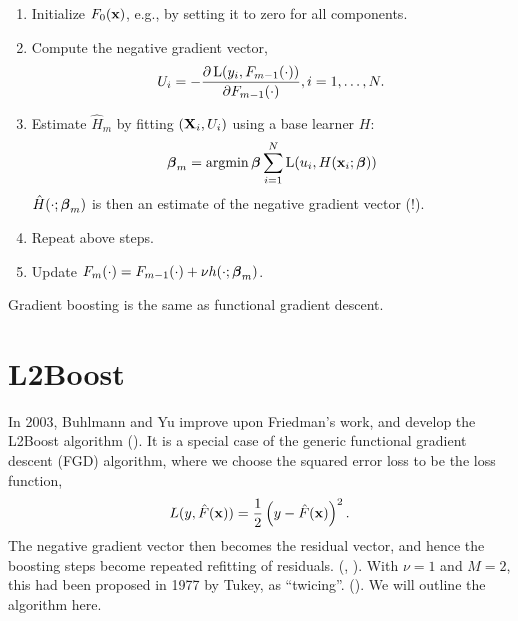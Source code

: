 \begin{enumerate}
    \item Initialize $F_0(\mathbf{x})$, e.g., by setting it to zero for all components.
    \item Compute the negative gradient vector,
        \begin{equation}
            U_i=-\frac{\partial \operatorname{L}(y_i,F_{m-1}(\cdot))}{\partial F_{m-1}(\cdot)}, i=1,\dotsc,N.
        \end{equation}
    \item Estimate $\hat{H}_m$ by fitting $(\mathbf{X}_i,U_i)$ using a base learner $H$:
        \begin{equation}
            \boldsymbol{\beta}_m=\operatorname*{argmin}{\boldsymbol{\beta}}\sum_{i=1}^N\operatorname{L}(u_i,H(\mathbf{x}_i;\boldsymbol{\beta}))
        \end{equation}
        $\hat{H}(\cdot;\boldsymbol{\beta}_m)$ is then an estimate of the negative gradient vector (!).
    \item Repeat above steps.
    \item Update $F_m(\cdot)=F_{m-1}(\cdot)+\nu h(\cdot;\boldsymbol{\beta}_m)$.
\end{enumerate}
Gradient boosting is the same as functional gradient descent.
\section{L2Boost}
In 2003, Buhlmann and Yu improve upon Friedman's work, and develop the L2Boost algorithm (\cite{buhlmann-yu}). It is a special case of the generic functional gradient descent (FGD) algorithm, where we choose the squared error loss to be the loss function,
\begin{equation}
    L(y,\hat{F}(\mathbf{x}))=\frac{1}{2}\left(y-\hat{F}(\mathbf{x})\right)^2.
\end{equation}
The negative gradient vector then becomes the residual vector, and hence the boosting steps become repeated refitting of residuals. (\cite{friedman2001}, \cite{buhlmann-yu}). With $\nu=1$ and $M=2$, this had been proposed in 1977 by Tukey, as ``twicing''. (\cite{tukey}).
We will outline the algorithm here.
